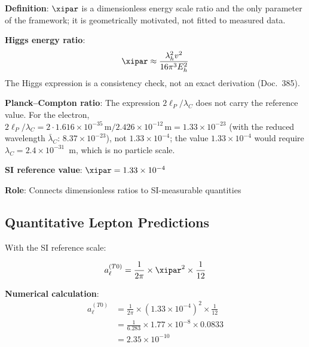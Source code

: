 	\begin{tcolorbox}[colback=green!5!white,colframe=green!75!black,title=SI Reference Scale]
		\textbf{Definition}: $\xipar$ is a dimensionless energy scale ratio and the only parameter of the framework; it is geometrically motivated, not fitted to measured data.
		
		\textbf{Higgs energy ratio}:
		\begin{equation}
			\xipar \approx \frac{\lambda_h^2 v^2}{16\pi^3 E_h^2}
		\end{equation}
		The Higgs expression is a consistency check, not an exact derivation (Doc.~385).
		
		\textbf{Planck--Compton ratio}: The expression $2\ell_P/\lambda_C$ does not carry the reference value. For the electron, $2\ell_P/\lambda_C = 2 \cdot 1.616\times10^{-35}\,\text{m}/2.426\times10^{-12}\,\text{m} = 1.33\times10^{-23}$ (with the reduced wavelength $\bar\lambda_C$: $8.37\times10^{-23}$), not $1.33\times10^{-4}$; the value $1.33\times10^{-4}$ would require $\lambda_C = 2.4\times10^{-31}$~m, which is no particle scale.
		
		\textbf{SI reference value}: $\xipar = 1.33 \times 10^{-4}$
		
		\textbf{Role}: Connects dimensionless ratios to SI-measurable quantities
	\end{tcolorbox}
	
	\subsection{Quantitative Lepton Predictions}
	
	With the SI reference scale:
	
	\begin{equation}
		a_{\ell}^{(T0)} = \frac{1}{2\pi} \times \xipar^2 \times \frac{1}{12}
		\label{eq:quantitative_lepton_correction}
	\end{equation}
	
	\textbf{Numerical calculation}:
	\begin{align}
		a_{\ell}^{(T0)} &= \frac{1}{2\pi} \times (1.33 \times 10^{-4})^2 \times \frac{1}{12} \\
		&= \frac{1}{6.283} \times 1.77 \times 10^{-8} \times 0.0833 \\
		&= 2.35 \times 10^{-10}
	\end{align}
	
